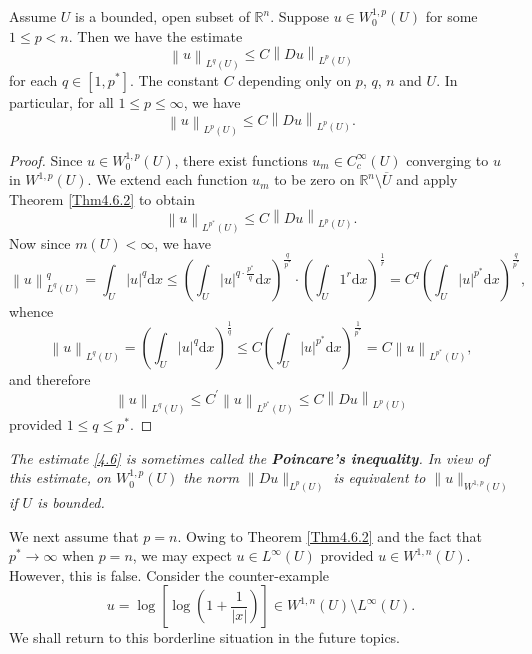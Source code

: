 \begin{theorem}
Assume $U$ is a bounded, open subset of $\mathbb{R}^n$. Suppose $u\in W_0^{1,p}(U)$ for some $1\le p<n$. Then we have the estimate 
\begin{equation}\label{4.6}
\left\| u \right\| _{L^q\left( U \right)}\le C\left\| Du \right\| _{L^p\left( U \right)}
\end{equation}
for each $q\in [1,p^*]$. The constant $C$ depending only on $p$, $q$, $n$ and $U$. In particular, for all $1\le p\le\infty$, we have 
$$
\left\| u \right\| _{L^p\left( U \right)}\le C\left\| Du \right\| _{L^p\left( U \right)}.
$$
\end{theorem}
\begin{proof}
Since $u\in W_0^{1,p}(U)$, there exist functions $u_m\in C_c^\infty(U)$ converging to $u$ in $W^{1,p}(U)$. We extend each function $u_m$ to be zero on $\mathbb{R}^n\setminus\overline{U}$ and apply Theorem \ref{Thm4.6.2} to obtain 
$$
\left\| u \right\| _{L^{p^*}\left( U \right)}\le C\left\| Du \right\| _{L^p\left( U \right)}.
$$
Now since $m(U)<\infty$, we have 
$$
\left\| u \right\| _{L^q\left( U \right)}^{q}=\int_U{\left| u \right|^q\mathrm{d}x}\le \left( \int_U{\left| u \right|^{q\cdot \frac{p^*}{q}}\mathrm{d}x} \right) ^{\frac{q}{p^*}}\cdot \left( \int_U{1^r\mathrm{d}x} \right) ^{\frac{1}{r}}=C^q\left( \int_U{\left| u \right|^{p^*}\mathrm{d}x} \right) ^{\frac{q}{p^*}},
$$
whence 
$$
\left\| u \right\| _{L^q\left( U \right)}=\left( \int_U{\left| u \right|^q\mathrm{d}x} \right) ^{\frac{1}{q}}\le C\left( \int_U{\left| u \right|^{p^*}\mathrm{d}x} \right) ^{\frac{1}{p^*}}=C\left\| u \right\| _{L^{p^*}\left( U \right)},
$$
and therefore 
$$
\left\| u \right\| _{L^q\left( U \right)}\le C^{\prime}\left\| u \right\| _{L^{p^*}\left( U \right)}\le C\left\| Du \right\| _{L^p\left( U \right)}
$$
provided $1\le q\le p^*$.
\end{proof}
\begin{note}\em
The estimate \eqref{4.6} is sometimes called the \textbf{Poincare's inequality}. In view of this estimate, on $W_0^{1,p}(U)$ the norm $\|Du\|_{L^p(U)}$ is equivalent to $\|u\|_{W^{1,p}(U)}$ if $U$ is bounded.
\end{note}
We next assume that $p=n$. Owing to Theorem \ref{Thm4.6.2} and the fact that $p^*\to\infty$ when $p=n$, we may expect $u\in L^\infty(U)$ provided $u\in W^{1,n}(U)$. However, this is false. Consider the counter-example 
$$
u=\log \left[ \log \left( 1+\frac{1}{\left| x \right|} \right) \right] \in W^{1,n}\left( U \right) \setminus L^{\infty}\left( U \right) .
$$
We shall return to this borderline situation in the future topics.\par
